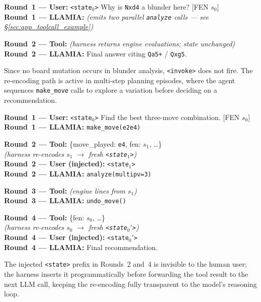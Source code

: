 \begin{tcolorbox}[notebox, title={\texttt{<invoke>} Turn Structure: Blunder Analysis}]
\small
\textbf{Round~1 --- User:} \texttt{<state$_0$>} Why is \texttt{Nxd4} a blunder here?
[FEN $s_0$]\\[3pt]
\textbf{Round~1 --- LLAMIA:} \textit{(emits two parallel \texttt{analyze} calls ---
see \S\ref{sec:app_toolcall_example})}

\tcbline
\textbf{Round~2 --- Tool:} \textit{(harness returns engine evaluations; state unchanged)}\\[3pt]
\textbf{Round~2 --- LLAMIA:} Final answer citing \texttt{Qa5+} / \texttt{Qxg5}.
\end{tcolorbox}

Since no board mutation occurs in blunder analysis, \texttt{<invoke>} does not fire.
The re-encoding path is active in multi-step planning episodes, where the agent sequences
\texttt{make\_move} calls to explore a variation before deciding on a recommendation.

\begin{tcolorbox}[notebox, title={\texttt{<invoke>} Turn Structure: Multi-step Planning}]
\small
\textbf{Round~1 --- User:} \texttt{<state$_0$>} Find the best three-move combination.
[FEN $s_0$]\\[3pt]
\textbf{Round~1 --- LLAMIA:} \texttt{make\_move(e2e4)}

\tcbline
\textbf{Round~2 --- Tool:} \{move\_played: \texttt{e4}, fen: $s_1$, \ldots\}\\
\textit{(harness re-encodes $s_1$ $\!\to\!$ fresh \texttt{<state$_1$>})}\\[3pt]
\textbf{Round~2 --- User (injected):} \texttt{<state$_1$>}\\[3pt]
\textbf{Round~2 --- LLAMIA:} \texttt{analyze(multipv=3)}

\tcbline
\textbf{Round~3 --- Tool:} \textit{(engine lines from $s_1$)}\\[3pt]
\textbf{Round~3 --- LLAMIA:} \texttt{undo\_move()}

\tcbline
\textbf{Round~4 --- Tool:} \{fen: $s_0$, \ldots\}\\
\textit{(harness re-encodes $s_0$ $\!\to\!$ fresh \texttt{<state$_0'$>})}\\[3pt]
\textbf{Round~4 --- User (injected):} \texttt{<state$_0'$>}\\[3pt]
\textbf{Round~4 --- LLAMIA:} Final recommendation.
\end{tcolorbox}

\noindent The injected \texttt{<state>} prefix in Rounds~2 and~4 is invisible to the
human user; the harness inserts it programmatically before forwarding the tool result to
the next LLM call, keeping the re-encoding fully transparent to the model's reasoning loop.

